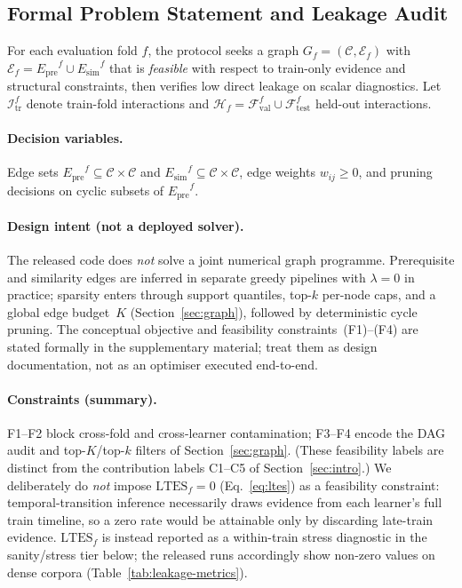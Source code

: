 \documentclass[preprint,10pt,doubleblind]{elsarticle}
\newcommand{\Epre}{\ensuremath{E_{\text{pre}}}}
\newcommand{\Esim}{\ensuremath{E_{\text{sim}}}}
\begin{document}
\subsection{Formal Problem Statement and Leakage Audit}
\label{sec:formal-problem}
For each evaluation fold $f$, the protocol seeks a graph
$G_f=(\mathcal{C},\mathcal{E}_f)$ with $\mathcal{E}_f=\Epre^f\cup\Esim^f$
that is \emph{feasible} with respect to train-only evidence and
structural constraints, then verifies low direct leakage on scalar
diagnostics. Let $\mathcal{I}_{\text{tr}}^f$ denote train-fold
interactions and $\mathcal{H}_f=\mathcal{F}_{\text{val}}^f\cup
\mathcal{F}_{\text{test}}^f$ held-out interactions.

\paragraph{Decision variables.}
Edge sets $\Epre^f\subseteq\mathcal{C}\times\mathcal{C}$ and
$\Esim^f\subseteq\mathcal{C}\times\mathcal{C}$, edge weights
$w_{ij}\ge 0$, and pruning decisions on cyclic subsets of $\Epre^f$.

\paragraph{Design intent (not a deployed solver).}
The released code does \emph{not} solve a joint numerical graph programme.
Prerequisite and similarity edges are inferred in separate greedy pipelines with
$\lambda{=}0$ in practice; sparsity enters through support quantiles, top-$k$
per-node caps, and a global edge budget~$K$ (Section~\ref{sec:graph}), followed
by deterministic cycle pruning. The conceptual objective
and feasibility constraints~(F1)--(F4) are
stated formally in the supplementary material; treat
them as design documentation, not as an optimiser executed end-to-end.

\paragraph{Constraints (summary).}
F1--F2 block cross-fold and cross-learner contamination; F3--F4 encode
the DAG audit and top-$K$/top-$k$ filters of Section~\ref{sec:graph}.
(These feasibility labels are distinct from the contribution labels
C1--C5 of Section~\ref{sec:intro}.)
We deliberately do \emph{not} impose $\mathrm{LTES}_f{=}0$
(Eq.~\eqref{eq:ltes}) as a feasibility constraint: temporal-transition
inference necessarily draws evidence from each learner's full train
timeline, so a zero rate would be attainable only by discarding
late-train evidence. $\mathrm{LTES}_f$ is instead reported as a
within-train stress diagnostic in the sanity/stress tier below; the
released runs accordingly show non-zero values on dense corpora
(Table~\ref{tab:leakage-metrics}).
\end{document}
